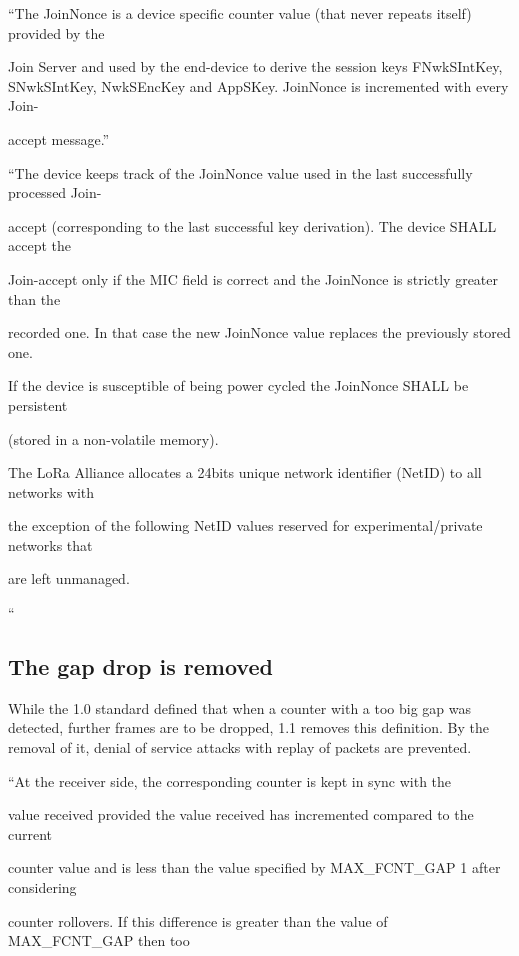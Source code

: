 {``The JoinNonce is a device specific counter value (that never repeats
itself) provided by the}

{Join Server and used by the end-device to derive the session keys
FNwkSIntKey, SNwkSIntKey, NwkSEncKey and AppSKey. JoinNonce is
incremented with every Join-}

{accept message.''}

{``The device keeps track of the JoinNonce value used in the last
successfully processed Join-}

{accept (corresponding to the last successful key derivation). The
device SHALL accept the}

{Join-accept only if the MIC field is correct and the JoinNonce is
strictly greater than the}

{recorded one. In that case the new JoinNonce value replaces the
previously stored one.}

{If the device is susceptible of being power cycled the JoinNonce SHALL
be persistent}

{(stored in a non-volatile memory).}

{The LoRa Alliance allocates a 24bits unique network identifier (NetID)
to all networks with}

{the exception of the following NetID values reserved for
experimental/private networks that}

{are left unmanaged.}

{``}

\hypertarget{h.6wjpqn9cabfu}{\subsection{\texorpdfstring{{The gap drop
is removed}}{The gap drop is removed}}\label{h.6wjpqn9cabfu}}

{While the 1.0 standard defined that when a counter with a too big gap
was detected, further frames are to be dropped, 1.1 removes this
definition. By the removal of it, denial of service attacks with replay
of packets are prevented.}

{``At the receiver side, the corresponding counter is kept in sync with
the}

{value received provided the value received has incremented compared to
the current}

{counter value and is less than the value specified by MAX\_FCNT\_GAP 1
after considering}

{counter rollovers. If this difference is greater than the value of
MAX\_FCNT\_GAP then too}

